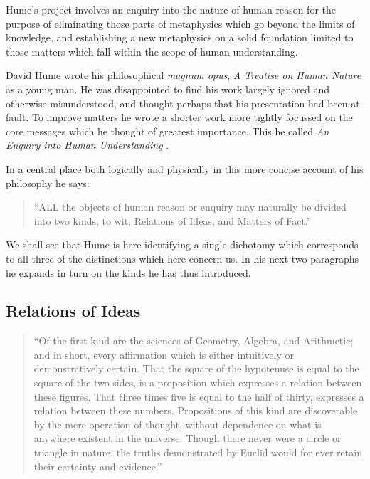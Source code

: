 Hume's project involves an enquiry into the nature of human reason for
the purpose of eliminating those parts of metaphysics which go beyond
the limits of knowledge, and establishing a new metaphysics on a
solid foundation limited to those matters which fall within the scope
of human understanding.

David Hume wrote his philosophical {\it magnum opus}, {\it A Treatise on
  Human Nature} \cite{hume39} as a young man.
He was disappointed to find his work largely ignored and otherwise
misunderstood, and thought perhaps that his presentation had been at
fault.
To improve matters he wrote a shorter work more tightly focussed
on the core messages which he thought of greatest importance.
This he called {\it An Enquiry into Human Understanding}
\cite{hume48}.

In a central place both logically and physically in this more concise
account of his philosophy he says:

\begin{quote}
``ALL the objects of human reason or enquiry may naturally be divided
  into two kinds, to wit, Relations of Ideas, and Matters of Fact.'' 
\end{quote}

We shall see that Hume is here identifying a single dichotomy which
corresponds to all three of the distinctions which here concern us.
In his next two paragraphs he expands in turn on the kinds he has thus
introduced.

\subsection{Relations of Ideas}

\begin{quote}
``Of the first kind are the sciences of Geometry, Algebra, and
Arithmetic; and in short, every affirmation which is either
intuitively or demonstratively certain.
That the square of the hypotenuse is equal to the square of the two
sides, is a proposition which expresses a relation between these
figures.
That three times five is equal to the half of thirty, expresses a
relation between these numbers.
Propositions of this kind are discoverable by the mere operation of
thought, without dependence on what is anywhere existent in the
universe.
Though there never were a circle or triangle in nature, the truths
demonstrated by Euclid would for ever retain their certainty and
evidence.''
\end{quote}

